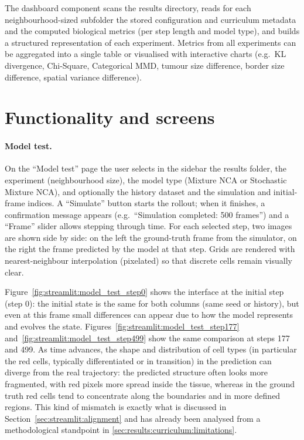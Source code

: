 The dashboard component scans the results directory, reads for each neighbourhood-sized subfolder the stored configuration and curriculum metadata and the computed biological metrics (per step length and model type), and builds a structured representation of each experiment.
Metrics from all experiments can be aggregated into a single table or visualised with interactive charts (e.g.\ KL divergence, Chi-Square, Categorical MMD, tumour size difference, border size difference, spatial variance difference).

\section{Functionality and screens}

\paragraph{Model test.}
On the ``Model test'' page the user selects in the sidebar the results folder, the experiment (neighbourhood size), the model type (Mixture NCA or Stochastic Mixture NCA), and optionally the history dataset and the simulation and initial-frame indices.
A ``Simulate'' button starts the rollout; when it finishes, a confirmation message appears (e.g.\ ``Simulation completed: 500 frames'') and a ``Frame'' slider allows stepping through time.
For each selected step, two images are shown side by side: on the left the ground-truth frame from the simulator, on the right the frame predicted by the model at that step.
Grids are rendered with nearest-neighbour interpolation (pixelated) so that discrete cells remain visually clear.

Figure~\ref{fig:streamlit:model_test_step0} shows the interface at the initial step (step 0): the initial state is the same for both columns (same seed or history), but even at this frame small differences can appear due to how the model represents and evolves the state.
Figures~\ref{fig:streamlit:model_test_step177} and~\ref{fig:streamlit:model_test_step499} show the same comparison at steps 177 and 499.
As time advances, the shape and distribution of cell types (in particular the red cells, typically differentiated or in transition) in the prediction can diverge from the real trajectory: the predicted structure often looks more fragmented, with red pixels more spread inside the tissue, whereas in the ground truth red cells tend to concentrate along the boundaries and in more defined regions.
This kind of mismatch is exactly what is discussed in Section~\ref{sec:streamlit:alignment} and has already been analysed from a methodological standpoint in \cref{sec:results:curriculum:limitations}.

